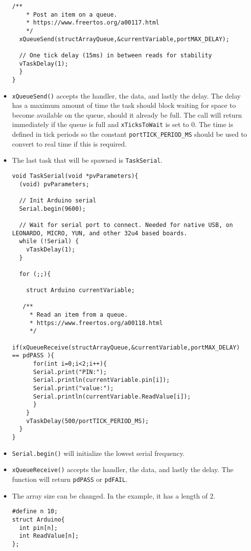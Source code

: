 \documentclass{article}
\begin{document}
\begin{itemize}
\begin{lstlisting}[style=cpp]
  /**
    * Post an item on a queue.
    * https://www.freertos.org/a00117.html
    */
  xQueueSend(structArrayQueue,&currentVariable,portMAX_DELAY);

  // One tick delay (15ms) in between reads for stability
  vTaskDelay(1);
  }
}
\end{lstlisting}

    \item \texttt{xQueueSend()} accepts the handler, the data, and lastly the delay. The delay has a maximum amount of time the task should block waiting for space to become available on the queue, should it already be full. The call will return immediately if the queue is full and \texttt{xTicksToWait} is set to 0. The time is defined in tick periods so the constant \texttt{portTICK\_PERIOD\_MS} should be used to convert to real time if this is required. 

    \item The last task that will be spawned is \texttt{TaskSerial}.
\begin{lstlisting}[style=cpp]
void TaskSerial(void *pvParameters){
  (void) pvParameters;

  // Init Arduino serial
  Serial.begin(9600);

  // Wait for serial port to connect. Needed for native USB, on LEONARDO, MICRO, YUN, and other 32u4 based boards.
  while (!Serial) {
    vTaskDelay(1);
  }
  
  for (;;){
    
    struct Arduino currentVariable;

   /**
     * Read an item from a queue.
     * https://www.freertos.org/a00118.html
     */
    if(xQueueReceive(structArrayQueue,&currentVariable,portMAX_DELAY) == pdPASS ){
      for(int i=0;i<2;i++){
      Serial.print("PIN:");
      Serial.println(currentVariable.pin[i]);
      Serial.print("value:");
      Serial.println(currentVariable.ReadValue[i]);
      }
    }
    vTaskDelay(500/portTICK_PERIOD_MS);
  }
}
\end{lstlisting}

    \item \texttt{Serial.begin()} will initialize the lowest serial frequency.
    \item \texttt{xQueueReceive()} accepts the handler, the data, and lastly the delay. The function will return \texttt{pdPASS} or \texttt{pdFAIL}.

    \item The array size can be changed. In the example, it has a length of 2.
\begin{lstlisting}[style=cpp]
#define n 10;
struct Arduino{
  int pin[n];
  int ReadValue[n];
};
\end{lstlisting}


\end{itemize}
\end{document}
